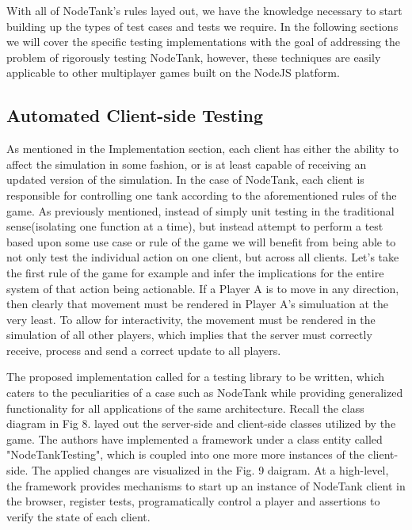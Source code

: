 \documentclass[conference]{IEEEtran}
\begin{document}
With all of NodeTank's rules layed out, we have the knowledge necessary to start building up the types of test cases and tests we require. 
In the following sections we will cover the specific testing implementations with the goal of addressing the problem of rigorously testing NodeTank, however, these techniques 
are easily applicable to other multiplayer games built on the NodeJS platform. 

\subsection{Automated Client-side Testing}

As mentioned in the Implementation section, each client has either the ability to affect the simulation in some fashion, or is at least capable of receiving an updated
version of the simulation. In the case of NodeTank, each client is responsible for controlling one tank according to the aforementioned rules of the game. As previously mentioned,
instead of simply unit testing in the traditional sense(isolating one function at a time), but instead attempt to perform a test based upon some use case or rule of the game we will
 benefit from being able to not only test the individual action on one client, but across all clients. Let's take the first rule of the game for example and infer the implications for the entire system 
 of that action being actionable. If a Player A is to move in any direction, then clearly that movement must be rendered in Player A's simuluation at the very least. To allow for interactivity, 
 the movement must be rendered in the simulation of all other players, which implies that the server must correctly receive, process and send a correct update to all players. 
 
 The proposed implementation called for a testing library to be written, which caters to the peculiarities of a case such as NodeTank while providing generalized functionality for all 
 applications of the same architecture. Recall the class diagram in Fig 8. layed out the server-side and client-side classes utilized by the game. The authors have implemented a framework
 under a class entity called "NodeTankTesting", which is coupled into one more more instances of the client-side. The applied changes are visualized in the Fig. 9 daigram. At a high-level,
 the framework provides mechanisms to start up an instance of NodeTank client in the browser, register tests, programatically control a player and assertions to verify the state of each client. 
\end{document}
